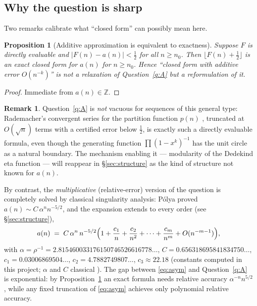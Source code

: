 \documentclass[11pt]{article}
\newtheorem{proposition}[theorem]{Proposition}
\theoremstyle{definition}
\newtheorem{remark}[theorem]{Remark}
\newcommand{\ZZ}{\mathbb{Z}}
\begin{document}
\subsection{Why the question is sharp}

Two remarks calibrate what ``closed form'' can possibly mean here.

\begin{proposition}[Additive approximation is equivalent to exactness]
\label{prop:rounding}
Suppose $F$ is directly evaluable and $|F(n)-a(n)|<\tfrac12$ for all $n\ge n_0$.
Then $\lfloor F(n)+\tfrac12\rfloor$ is an exact closed form for $a(n)$ for
$n \ge n_0$. Hence ``closed form with additive error $O(n^{-k})$'' is not a
relaxation of Question~\ref{q:A} but a reformulation of it.
\end{proposition}

\begin{proof}
Immediate from $a(n)\in\ZZ$.
\end{proof}

\begin{remark}
Question~\ref{q:A} is \emph{not} vacuous for sequences of this general type:
Rademacher's convergent series for the partition function $p(n)$
\cite{Rademacher1937}, truncated at $O(\sqrt n)$ terms with a certified error
below $\tfrac12$, is exactly such a directly evaluable formula, even though the
generating function $\prod (1-x^k)^{-1}$ has the unit circle as a natural
boundary. The mechanism enabling it --- modularity of the Dedekind eta function
--- will reappear in \S\ref{sec:structure} as the kind of structure not known
for $a(n)$.
\end{remark}

By contrast, the \emph{multiplicative} (relative-error) version of the question
is completely solved by classical singularity analysis: P\'olya \cite{Polya1937}
proved $a(n)\sim C\,\alpha^{n}n^{-5/2}$, and the expansion extends to every
order (see \S\ref{sec:structure}),
\begin{equation}\label{eq:asym}
a(n)\;=\;C\,\alpha^{n}\,n^{-5/2}\Bigl(1+\frac{c_1}{n}+\frac{c_2}{n^2}+\cdots+
\frac{c_m}{n^m}+O(n^{-m-1})\Bigr),
\end{equation}
with $\alpha=\rho^{-1}=2.815460033176150746526616778\ldots$,
$C=0.656318695841834750\ldots$, $c_1=0.03006869504\ldots$,
$c_2=4.7882749807\ldots$, $c_3\approx 22.18$ (constants computed in this
project; $\alpha$ and $C$ classical \cite{RHB1976,Finch2003,FS2009}). The gap
between \eqref{eq:asym} and Question~\ref{q:A} is exponential: by
Proposition~\ref{prop:rounding} an exact formula needs relative accuracy
$\alpha^{-n}n^{5/2}$, while any fixed truncation of \eqref{eq:asym} achieves
only polynomial relative accuracy.
\end{document}
